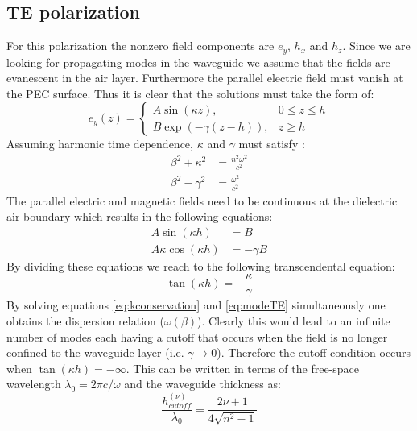 \documentclass[main.tex]{subfile}
\begin{document}
\subsection*{TE polarization}
For this polarization the nonzero field components are $e_y$, $h_x$ and $h_z$. 
Since we are looking for propagating modes in the waveguide we assume that the fields are evanescent in the air layer. 
Furthermore the parallel electric field must vanish at the PEC surface. 
Thus it is clear that the solutions must take the form of:
\begin{equation}
e_y(z)= 
\begin{cases}
A\sin(\kappa z),  &  0\leq z \leq h \\ 
B\exp\left(-\gamma (z-h)\right),  &  z \geq h
\end{cases}
\end{equation}
Assuming harmonic time dependence, $\kappa $ and $\gamma$ must satisfy :
\begin{equation}
\label{eq:kconservation}
\begin{aligned}
\beta^2  +\kappa^2  &=\frac{n^2\omega^2}{c^2} \\
\beta^2  -\gamma^2 &= \frac{\omega^2}{c^2}
\end{aligned}
\end{equation}
The parallel electric and magnetic fields need to be continuous at the dielectric air boundary which results in the following equations:
\begin{equation}
\label{eq:BCTE}
\begin{aligned}
A\sin(\kappa h)&=B
\\ A\kappa \cos(\kappa h)& = -\gamma B
\end{aligned}
\end{equation}
By dividing these equations we reach to the following transcendental equation:
\begin{equation}
\label{eq:modeTE}
\tan(\kappa h)=-\frac{\kappa}{\gamma}
\end{equation}
By solving equations  \ref{eq:kconservation} and \ref{eq:modeTE} simultaneously one obtains the dispersion relation ($\omega (\beta)$). Clearly this would lead to an infinite number of modes each having a cutoff that occurs when the field is no longer confined to the waveguide layer (i.e. $\gamma \rightarrow 0 $). Therefore the cutoff condition occurs when $\tan(\kappa h)= -\infty$. This can be written in terms of the free-space wavelength $\lambda_0= 2\pi c/\omega$  and the waveguide thickness as: 
\begin{equation}
\label{eq:cutTE}
\frac{h_{cutoff}^{(\nu)}}{\lambda_0}= \frac{2\nu+1}{4\sqrt{n^2 -1}} 
\end{equation}
\end{document}
